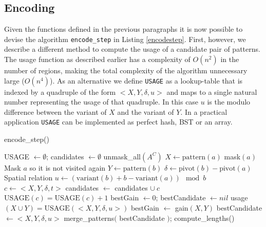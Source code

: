 \documentclass{llncs}
\begin{document}
\subsection{Encoding}
Given the functions defined in the previous paragraphs it is now possible to devise the algorithm \texttt{encode\_step} in Listing \ref{encodestep}. First, however, we describe a different method to compute the usage of a candidate pair of patterns. The usage function as described earlier has a complexity of $O(n^2)$ in the number of regions, making the total complexity of the algorithm unnecessary large ($O(n^4)$). As an alternative we define \texttt{USAGE} as a lookup-table that is indexed by a quadruple of the form $<X,Y,\delta,u>$ and maps to a single natural number representing the usage of that quadruple. In this case $u$ is the modulo difference between the variant of $X$ and the variant of $Y$. In a practical application \texttt{USAGE} can be implemented as perfect hash, BST or an array.

\begin{algorithm}
\caption{encode\_step()}
\label{encodestep}
\begin{algorithmic}
\State USAGE $\gets \emptyset$; candidates $\gets \emptyset$
\State unmask\_all$(A^C)$
	\State $X \gets \mathrm{pattern}(a) $
	\State mask$(a)$
		\Comment Mask $a$ so it is not visited again
		\State $Y \gets \mathrm{pattern}(b) $
		\State $\delta \gets \mathrm{pivot}(b) - \mathrm{pivot}(a)$
			\Comment Spatial relation
		\State $u \gets (\mathrm{variant}(b) + b - \mathrm{variant}(a)) \mod b$
		\State $c \gets <X,Y,\delta,t>$
			\State candidates $\gets$ candidates $\cup \ c$
		\EndIf
		\State $\mathrm{USAGE}(c) = \mathrm{USAGE}(c) + 1$
	\EndFor
\EndFor
\State bestGain $\gets 0$; bestCandidate $\gets nil$
	\State usage$(X\cup Y) = \mathrm{USAGE}(<X,Y,\delta,u>)$
	\State bestGain $\gets$ gain$(X,Y)$
	\State bestCandidate $\gets <X,Y,\delta,u>$
	\EndIf
\EndFor
{}
	\State merge\_patterns$($ bestCandidate $)$; compute\_lengths()
\EndIf
\State {}
\end{algorithmic}
\end{algorithm} 
\end{document}
